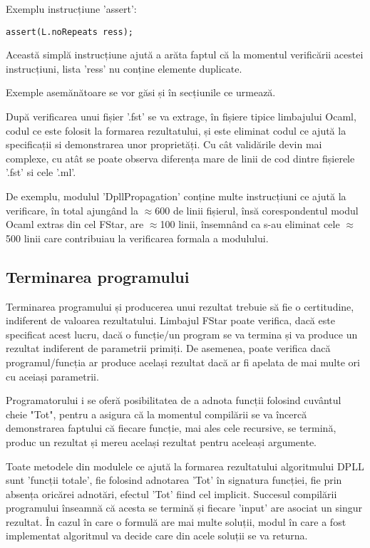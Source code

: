 Exemplu instrucțiune 'assert':
\begin{lstlisting}[]
assert(L.noRepeats ress);

\end{lstlisting}

Această simplă instrucțiune ajută a arăta faptul că la momentul verificării acestei instrucțiuni, lista 'ress' nu conține elemente duplicate.

Exemple asemănătoare se vor găsi și în secțiunile ce urmează.

După verificarea unui fișier '.fst' se va extrage, în fișiere tipice limbajului Ocaml, codul ce este folosit la formarea rezultatului, și este eliminat codul ce ajută la \newline specificații si demonstrarea unor proprietăți. Cu cât validările devin mai complexe, cu atât se poate observa diferența mare de linii de cod dintre fișierele '.fst' si cele '.ml'.

De exemplu, modulul 'DpllPropagation' conține multe instrucțiuni ce ajută la verificare, în total ajungând la $\approx$600 de linii fișierul, însă corespondentul modul Ocaml extras din cel FStar, are $\approx$100 linii, însemnând ca s-au eliminat cele $\approx$500 linii care contribuiau la verificarea formala a modulului.

\subsection{Terminarea programului}

Terminarea programului și producerea unui rezultat trebuie să fie o certitudine, indiferent de valoarea rezultatului. Limbajul FStar poate verifica, dacă este specificat acest lucru, dacă o funcție/un program se va termina și va produce un rezultat indiferent de parametrii primiți. De asemenea, poate verifica dacă programul/funcția ar produce același rezultat dacă ar fi apelata de mai multe ori cu aceiași parametrii.

Programatorului i se oferă posibilitatea de a adnota funcții folosind cuvântul cheie "Tot", pentru a asigura că la momentul compilării se va încercă demonstrarea faptului că fiecare funcție, mai ales cele recursive, se termină, produc un rezultat și mereu același rezultat pentru aceleași argumente. 

\newpage

Toate metodele din modulele ce ajută la formarea rezultatului algoritmului DPLL sunt 'funcții totale', fie folosind adnotarea 'Tot' în signatura funcției, fie prin absența oricărei adnotări, efectul 'Tot' fiind cel implicit. Succesul compilării programului înseamnă că acesta se termină și fiecare 'input' are asociat un singur rezultat. În cazul în care o formulă are mai multe soluții, modul în care a fost implementat algoritmul va decide care din acele soluții se va returna.


